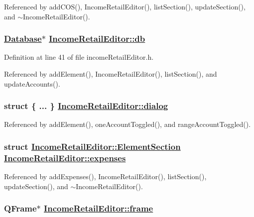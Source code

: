 Referenced by add\-COS(), Income\-Retail\-Editor(), list\-Section(), update\-Section(), and $\sim$Income\-Retail\-Editor().\hypertarget{classIncomeRetailEditor_r0}{
\subsubsection[db]{\setlength{\rightskip}{0pt plus 5cm}\hyperlink{classDatabase}{Database}$\ast$ \hyperlink{classIncomeRetailEditor_r0}{Income\-Retail\-Editor::db}}}
\label{classIncomeRetailEditor_r0}


Definition at line 41 of file income\-Retail\-Editor.h.

Referenced by add\-Element(), Income\-Retail\-Editor(), list\-Section(), and update\-Accounts().\hypertarget{classIncomeRetailEditor_r33}{
\subsubsection[dialog]{\setlength{\rightskip}{0pt plus 5cm}struct \{ ... \}   \hyperlink{classIncomeRetailEditor_r33}{Income\-Retail\-Editor::dialog}}}
\label{classIncomeRetailEditor_r33}




Referenced by add\-Element(), one\-Account\-Toggled(), and range\-Account\-Toggled().\hypertarget{classIncomeRetailEditor_r6}{
\subsubsection[expenses]{\setlength{\rightskip}{0pt plus 5cm}struct \hyperlink{structIncomeRetailEditor_1_1ElementSection}{Income\-Retail\-Editor::Element\-Section}  \hyperlink{classIncomeRetailEditor_r6}{Income\-Retail\-Editor::expenses}}}
\label{classIncomeRetailEditor_r6}




Referenced by add\-Expenses(), Income\-Retail\-Editor(), list\-Section(), update\-Section(), and $\sim$Income\-Retail\-Editor().\hypertarget{classIncomeRetailEditor_r2}{
\subsubsection[frame]{\setlength{\rightskip}{0pt plus 5cm}QFrame$\ast$ \hyperlink{classIncomeRetailEditor_r2}{Income\-Retail\-Editor::frame}}}
\label{classIncomeRetailEditor_r2}



